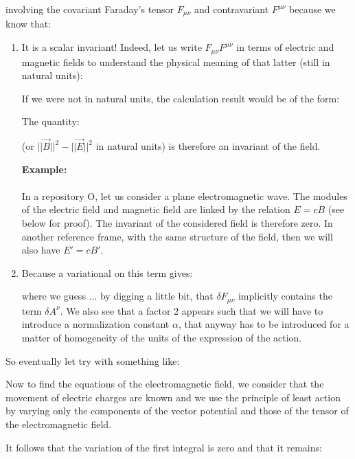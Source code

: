 	involving the covariant Faraday's tensor $F_{\mu\nu}$ and contravariant $F^{\mu \nu}$ because we know that:
	\begin{enumerate}
		\item It is a scalar invariant! Indeed, let us write $F_{\mu\nu}F^{\mu\nu}$ in terms of electric and magnetic fields to understand the physical meaning of that latter (still in natural units):
		
		\begin{tcolorbox}[title=Remark,colframe=black,arc=10pt]
		If we were not in natural units, the calculation result would be of the form:
		
		The quantity:
		
		(or $||\vec{B}||^2-||\vec{E}||^2$ in natural units) is therefore an invariant of the field.
		\end{tcolorbox}
		\begin{tcolorbox}[colframe=black,colback=white,sharp corners]
		\textbf{{\Large {}}Example:}\\\\
		In a repository O, let us consider a plane electromagnetic wave. The modules of the electric field and magnetic field are linked by the relation $E=cB$ (see below for proof). The invariant of the considered field is therefore zero. In another reference frame, with the same structure of the field, then we will also have $E'=cB'$.
		\end{tcolorbox}
		
		\item Because a variational on this term gives:
		
		where we guess ... by digging a little bit, that $\delta F_{\mu\nu}$ implicitly contains the term $\delta A^\nu$. We also see that a factor $2$ appears such that we will have to introduce a normalization constant $\alpha$,  that anyway has to be introduced for a matter of homogeneity of the units of the expression of the action.
	\end{enumerate}
	
	So eventually let try with something like:
	
	Now to find the equations of the electromagnetic field, we consider that the movement of electric charges are known and we use the principle of least action by varying only the components of the vector potential and those of the tensor of the electromagnetic field.

	It follows that the variation of the first integral is zero and that it remains:
	
